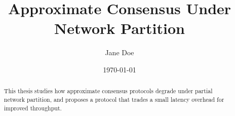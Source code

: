 \documentclass[english,thesis]{tudscrbook}
\title{Approximate Consensus Under Network Partition}
\author{Jane Doe}
\date{\today}
\begin{document}
\maketitle

\begin{abstract}
This thesis studies how approximate consensus protocols degrade under
partial network partition, and proposes a protocol that trades a small
latency overhead for improved throughput.
\end{abstract}

\tableofcontents






\end{document}
